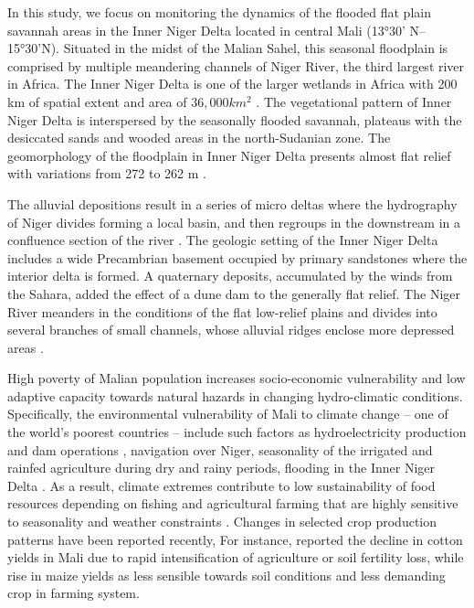 \documentclass[12pt,a4paper,oneside]{article}
\def \newpar{\vspace{6pt}}
\begin{document}
\newpar In this study, we focus on monitoring the dynamics of the flooded flat plain savannah areas in the Inner Niger Delta located in central Mali (13°30' N--15°30'N). Situated in the midst of the Malian Sahel, this seasonal floodplain is comprised by multiple meandering channels of Niger River, the third largest river in Africa. The Inner Niger Delta is one of the larger wetlands in Africa with 200 km of spatial extent and area of $36,000 km^2$ \citep{KUPER200383}. The vegetational pattern of Inner Niger Delta is interspersed by the seasonally flooded savannah, plateaus with the desiccated sands and wooded areas in the north-Sudanian zone. The geomorphology of the floodplain in Inner Niger Delta presents almost flat relief with variations from 272 to 262 m \citep{Gallais2003}. 

\newpar The alluvial depositions result in a series of micro deltas where the hydrography of Niger divides forming a local basin, and then regroups in the downstream in a confluence section of the river \citep{dickens2018flows}. The geologic setting of the Inner Niger Delta includes a wide Precambrian basement occupied by primary sandstones where the interior delta is formed. A quaternary deposits, accumulated by the winds from the Sahara, added the effect of a dune dam to the generally flat relief. The Niger River meanders in the conditions of the flat low-relief plains and divides into several branches of small channels, whose alluvial ridges enclose more depressed areas \citep{Gourou}.

\newpar High poverty of Malian population increases socio-economic vulnerability and low adaptive capacity towards natural hazards in changing hydro-climatic conditions. Specifically, the environmental vulnerability of Mali to climate change -- one of the world’s poorest countries -- include such factors as hydroelectricity production and dam operations \citep{w11091766}, navigation over Niger, seasonality of the irrigated and rainfed agriculture during dry and rainy periods, flooding in the Inner Niger Delta \citep{Ghile}. As a result, climate extremes contribute to low sustainability of food resources depending on fishing and agricultural farming that are highly sensitive to seasonality and weather constraints \citep{Morand,LIERSCH2019176}. Changes in selected crop production patterns have been reported recently, For instance, \citep{LARIS20151} reported the decline in cotton yields in Mali due to rapid intensification of agriculture or soil fertility loss, while rise in maize yields as less sensible towards soil conditions and less demanding crop in farming system.
\end{document}
